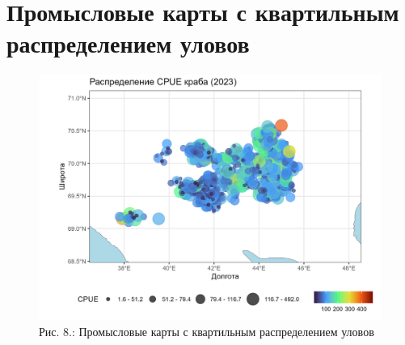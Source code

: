 \documentclass[
  letterpaper,
  DIV=11,
  numbers=noendperiod]{scrreprt}
\begin{document}
\section{Промысловые карты с квартильным распределением
уловов}\label{ux43fux440ux43eux43cux44bux441ux43bux43eux432ux44bux435-ux43aux430ux440ux442ux44b-ux441-ux43aux432ux430ux440ux442ux438ux43bux44cux43dux44bux43c-ux440ux430ux441ux43fux440ux435ux434ux435ux43bux435ux43dux438ux435ux43c-ux443ux43bux43eux432ux43eux432}

\begin{figure}[H]

{\centering \includegraphics[width=0.8\linewidth,height=\textheight,keepaspectratio]{images/KARTOGRAPH8.jpg}

}

\caption{Рис. 8.: Промысловые карты с квартильным распределением уловов}

\end{figure}%
\end{document}

